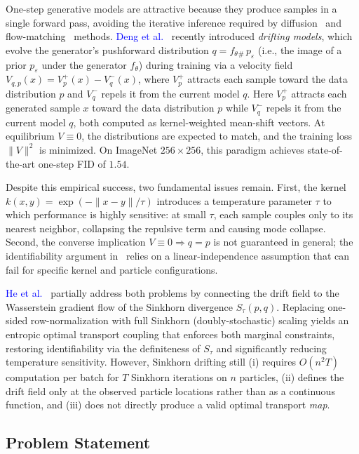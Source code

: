 \documentclass[10pt,conference,compsocconf]{IEEEtran}
\newcommand{\citet}[2]{\textcolor{blue}{#1}~\cite{#2}}
\begin{document}
One-step generative models are attractive because they produce samples in a single forward pass, avoiding the iterative inference required by diffusion~\cite{ho2020denoising,song2021score} and flow-matching~\cite{lipman2022flow} methods.
\citet{Deng et al.}{deng2026drifting} recently introduced \emph{drifting models}, which evolve the generator's pushforward distribution $q = f_\theta{}_\#\, p_\varepsilon$ (i.e., the image of a prior $p_\varepsilon$ under the generator $f_\theta$) during training via a velocity field $V_{q,p}(x) = V_p^+(x) - V_q^-(x)$, where $V_p^+$ attracts each sample toward the data distribution $p$ and $V_q^-$ repels it from the current model $q$.
Here $V_p^+$ attracts each generated sample $x$ toward the data distribution $p$ while $V_q^-$ repels it from the current model $q$, both computed as kernel-weighted mean-shift vectors.
At equilibrium $V \equiv 0$, the distributions are expected to match, and the training loss $\|V\|^2$ is minimized.
On ImageNet $256\!\times\!256$, this paradigm achieves state-of-the-art one-step FID of $1.54$. 

Despite this empirical success, two fundamental issues remain.
First, the kernel $k(x,y)=\exp(-\|x-y\|/\tau)$ introduces a temperature parameter $\tau$ to which performance is highly sensitive: at small $\tau$, each sample couples only to its nearest neighbor, collapsing the repulsive term and causing mode collapse.
Second, the converse implication $V \equiv 0 \Rightarrow q = p$ is not guaranteed in general; the identifiability argument in~\cite{deng2026drifting} relies on a linear-independence assumption that can fail for specific kernel and particle configurations. 

\citet{He et al.}{he2026sinkhorn} partially address both problems by connecting the drift field to the Wasserstein gradient flow of the Sinkhorn divergence $S_\tau(p,q)$.
Replacing one-sided row-normalization with full Sinkhorn (doubly-stochastic) scaling yields an entropic optimal transport coupling that enforces both marginal constraints, restoring identifiability via the definiteness of $S_\tau$ and significantly reducing temperature sensitivity.
However, Sinkhorn drifting still (i) requires $O(n^2 T)$ computation per batch for $T$ Sinkhorn iterations on $n$ particles, (ii) defines the drift field only at the observed particle locations rather than as a continuous function, and (iii) does not directly produce a valid optimal transport \emph{map}. 


\subsection{Problem Statement}
\end{document}
